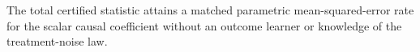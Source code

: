The total certified statistic attains a matched parametric mean-squared-error rate for the scalar causal coefficient without an outcome learner or knowledge of the treatment-noise law.